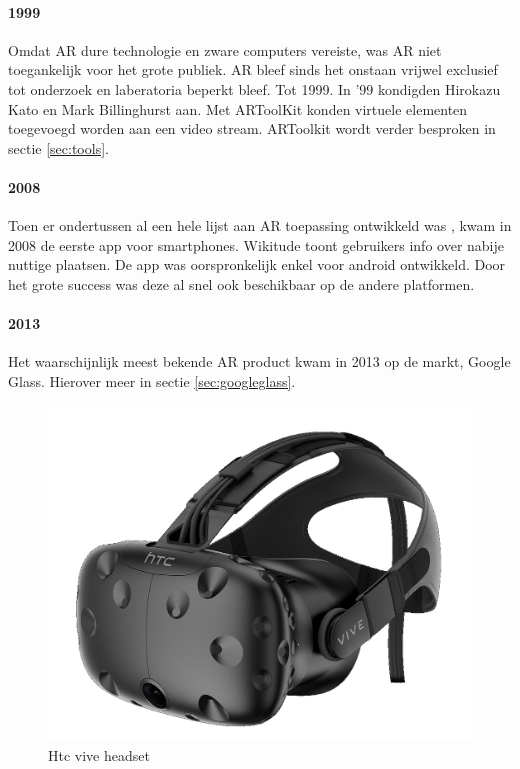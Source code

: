 \documentclass[pdftex,a4paper,12pt,twoside]{report}
\begin{document}
\paragraph{1999} Omdat AR dure technologie en zware computers vereiste, was AR niet toegankelijk voor het grote publiek. AR bleef sinds het onstaan vrijwel exclusief tot onderzoek en laberatoria beperkt bleef. Tot 1999. In '99 kondigden Hirokazu Kato en Mark Billinghurst \cite{artoolkit} aan. Met ARToolKit konden virtuele elementen toegevoegd worden aan een video stream. ARToolkit wordt verder besproken in sectie \ref{sec:tools}.

\paragraph{2008}Toen er ondertussen al een hele lijst aan AR toepassing ontwikkeld was \citep{history2}, kwam in 2008 de eerste app voor smartphones. Wikitude toont gebruikers info over nabije nuttige plaatsen. De app was oorspronkelijk enkel voor android ontwikkeld. Door het grote success was deze al snel ook beschikbaar op de andere platformen.

\paragraph{2013} Het waarschijnlijk meest bekende AR product kwam in 2013 op de markt, Google Glass. Hierover meer in sectie \ref{sec:googleglass}.
\newpage
\begin{figure}

\label{fig:htcvive}
\includegraphics[scale=0.15]{htcvive.png}
\caption{Htc vive headset \citep{htcvive}}

\end{figure}
\end{document}
